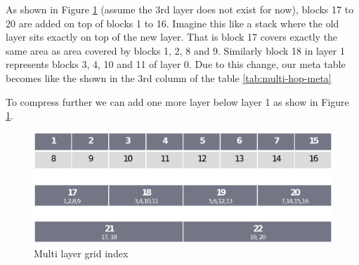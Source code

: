{As shown in Figure \ref{fig:multi-grid2} (assume the 3rd layer does not exist for now), blocks 17 to 20 are added on top of blocks 1 to 16. Imagine this like a stack where the old layer sits exactly on top of the new layer. That is block 17 covers exactly the same area as area covered by blocks 1, 2, 8 and 9. Similarly block 18 in layer 1 represents blocks 3, 4, 10 and 11 of layer 0. Due to this change, our meta table becomes like the shown in the 3rd column of the table \ref{tab:multi-hop-meta}


To compress further we can add one more layer below layer 1 as show in Figure \ref{fig:multi-grid2}.

\begin{figure}[t]
    \centering
    \includegraphics[width=0.8\linewidth]{images/image06.eps}
    \caption{Multi layer grid index}
    \label{fig:multi-grid2}
\end{figure}

}
